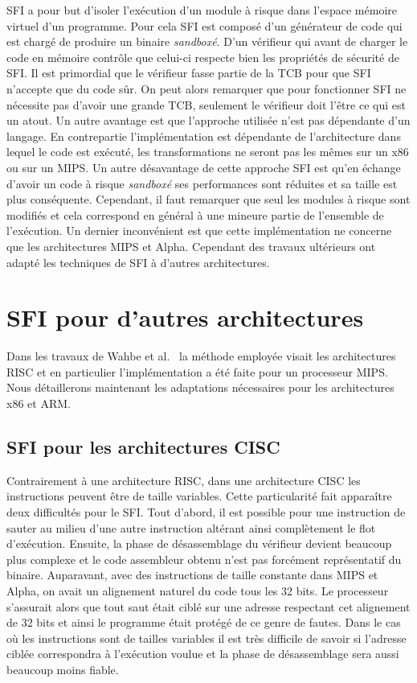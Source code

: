 \documentclass[11pt]{sdm}
\begin{document}
SFI a pour but d'isoler l'exécution d'un module à risque dans l'espace mémoire virtuel d'un programme. Pour cela SFI est composé d'un générateur de code qui est chargé de produire un binaire \textit{sandboxé}. D'un vérifieur qui avant de charger le code en mémoire contrôle que celui-ci respecte bien les propriétés de sécurité de SFI. Il est primordial que le vérifieur fasse partie de la TCB pour que SFI n'accepte que du code sûr. On peut alors remarquer que pour fonctionner SFI ne nécessite pas d'avoir une grande TCB, seulement le vérifieur doit l'être ce qui est un atout. Un autre avantage est que l'approche utilisée n'est pas dépendante d'un langage. En contrepartie l'implémentation est dépendante de l'architecture dans lequel le code est exécuté, les transformations ne seront pas les mêmes sur un x86 ou sur un MIPS. Un autre désavantage de cette approche SFI est qu'en échange d'avoir un code à risque \textit{sandboxé} ses performances sont réduites et sa taille est plus conséquente. Cependant, il faut remarquer que seul les modules à risque sont modifiés et cela correspond en général à une mineure partie de l'ensemble de l'exécution. Un dernier inconvénient est que cette implémentation ne concerne que les architectures MIPS et Alpha. Cependant des travaux ultérieurs ont adapté les techniques de SFI à d'autres architectures.

  
\section{SFI pour d'autres architectures}

Dans les travaux de Wahbe et al.~\cite{Wahbe:1993:ESF:173668.168635} la méthode employée visait les architectures RISC et en particulier l'implémentation a été faite pour un processeur MIPS. Nous détaillerons maintenant les adaptations nécessaires pour les architectures x86 et ARM.

\subsection{SFI pour les architectures CISC}
	Contrairement à une architecture RISC, dans une architecture CISC les instructions peuvent être de taille variables. Cette particularité fait apparaître deux difficultés pour le SFI. Tout d'abord, il est possible pour une instruction de sauter au milieu d'une autre instruction altérant ainsi complètement le flot d'exécution. Ensuite, la phase de désassemblage du vérifieur devient beaucoup plus complexe et le code assembleur obtenu n'est pas forcément représentatif du binaire. Auparavant, avec des instructions de taille constante dans MIPS et Alpha, on avait un alignement naturel du code tous les 32 bits. Le processeur s'assurait alors que tout saut était ciblé sur une adresse respectant cet alignement de 32 bits et ainsi le programme était protégé de ce genre de fautes. Dans le cas où les instructions sont de tailles variables il est très difficile de savoir si l'adresse ciblée correspondra à l'exécution voulue et la phase de désassemblage sera aussi beaucoup moins fiable.
	
\end{document}
